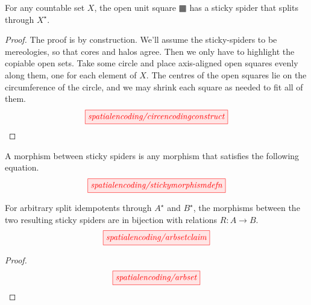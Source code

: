 
\clearpage

\begin{myboxB}
\begin{proposition}
For any countable set $X$, the open unit square $\squarehvfill$ has a sticky spider that splits through $X^\star$.
\begin{proof}
The proof is by construction. We'll assume the sticky-spiders to be mereologies, so that cores and halos agree. Then we only have to highlight the copiable open sets. Take some circle and place axis-aligned open squares evenly along them, one for each element of $X$. The centres of the open squares lie on the circumference of the circle, and we may shrink each square as needed to fit all of them.
\[\scalebox{1}{\tikzfig{spatialencoding/circencodingconstruct}}\]
\end{proof}
\end{proposition}
\end{myboxB}

\begin{myboxB}
\begin{defn}
A morphism between sticky spiders is any morphism that satisfies the following equation.
\[\scalebox{1}{\tikzfig{spatialencoding/stickymorphismdefn}}\]
\end{defn}
\end{myboxB}

\begin{myboxB}
\begin{proposition}
For arbitrary split idempotents through $A^\star$ and $B^\star$, the morphisms between the two resulting sticky spiders are in bijection with relations $R: A \rightarrow B$.
\[\scalebox{1}{\tikzfig{spatialencoding/arbsetclaim}}\]
\begin{proof}
\[\scalebox{1}{\tikzfig{spatialencoding/arbset}}\]
\end{proof}
\end{proposition}
\end{myboxB}

